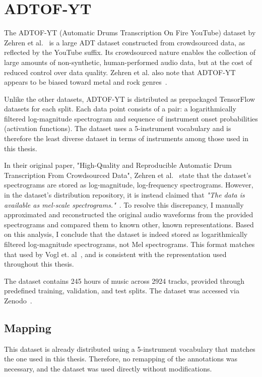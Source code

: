\section{ADTOF-YT}

The ADTOF-YT (Automatic Drums Transcription On Fire YouTube) dataset by Zehren et al.~\cite{signals4040042} is a large \gls{ADT} dataset constructed from crowdsourced data, as reflected by the YouTube suffix. Its crowdsourced nature enables the collection of large amounts of non-synthetic, human-performed audio data, but at the cost of reduced control over data quality. Zehren et al. also note that ADTOF-YT appears to be biased toward metal and rock genres~\cite{signals4040042}.

Unlike the other datasets, ADTOF-YT is distributed as prepackaged TensorFlow datasets for each split. Each data point consists of a pair: a logarithmically filtered log-magnitude spectrogram and sequence of instrument onset probabilities (activation functions). The dataset uses a 5-instrument vocabulary and is therefore the least diverse dataset in terms of instruments among those used in this thesis.

In their original paper, "High-Quality and Reproducible Automatic Drum Transcription From Crowdsourced Data", Zehren et al.~\cite{signals4040042} state that the dataset's spectrograms are stored as log-magnitude, log-frequency spectrograms. However, in the dataset's distribution repository, it is instead claimed that \textit{"The data is available as mel-scale spectrograms."}~\cite{zehren_2023_10084511}. To resolve this discrepancy, I manually approximated and reconstructed the original audio waveforms from the provided spectrograms and compared them to known other, known representations. Based on this analysis, I conclude that the dataset is indeed stored as logarithmically filtered log-magnitude spectrograms, not Mel spectrograms. This format matches that used by Vogl et. al~\cite{Vogl2017DrumTV}, and is consistent with the representation used throughout this thesis.

The dataset contains 245 hours of music across 2924 tracks, provided through predefined training, validation, and test splits. The dataset was accessed via Zenodo~\cite{zehren_2023_10084511, signals4040042}.

\subsection{Mapping}

This dataset is already distributed using a 5-instrument vocabulary that matches the one used in this thesis. Therefore, no remapping of the annotations was necessary, and the dataset was used directly without modifications.

